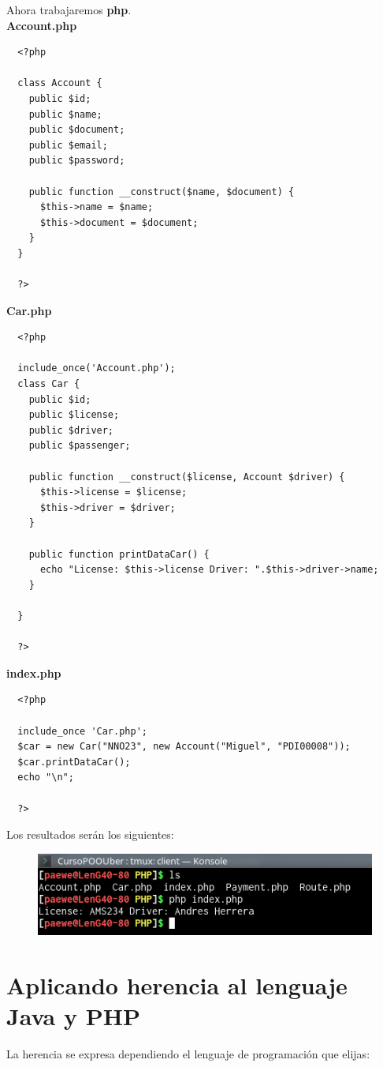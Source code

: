 \documentclass{article}
\begin{document}
Ahora trabajaremos \textbf{php}.\\

\textbf{Account.php}
\begin{verbatim}
  <?php

  class Account {
    public $id;
    public $name;
    public $document;
    public $email;
    public $password;

    public function __construct($name, $document) {
      $this->name = $name;
      $this->document = $document;
    }
  }

  ?>
\end{verbatim}

\textbf{Car.php}
\begin{verbatim}
  <?php

  include_once('Account.php');
  class Car {
    public $id;
    public $license;
    public $driver;
    public $passenger;

    public function __construct($license, Account $driver) {
      $this->license = $license;
      $this->driver = $driver;
    }

    public function printDataCar() {
      echo "License: $this->license Driver: ".$this->driver->name;
    }

  }

  ?>
\end{verbatim}

\textbf{index.php}
\begin{verbatim}
  <?php

  include_once 'Car.php';
  $car = new Car("NNO23", new Account("Miguel", "PDI00008"));
  $car.printDataCar();
  echo "\n";

  ?>
\end{verbatim}

Los resultados serán los siguientes:

\begin{figure}[h!]
  \centering
  \includegraphics[scale=0.75]{./Pictures/019_resultado_php.png}
\end{figure}

\section{Aplicando herencia al lenguaje Java y PHP}%
La herencia se expresa dependiendo el lenguaje de programación que elijas:\\
\end{document}
